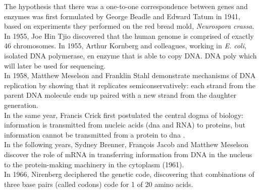 The hypothesis that there was a one-to-one correspondence between genes and enzymes was first formulated by George Beadle and Edward Tatum in 1941, based on experiments they performed on the red bread mold, \textit{Neurospora crassa}.\\


In 1955, Joe Hin Tjio discovered that the human genome is comprised of exactly 46 chromosomes.
In 1955, Arthur Kornberg and colleagues, working in \textit{E. coli}, isolated DNA polymerase, en enzyme that is able to copy DNA.
DNA poly which will later be used for sequencing.\\

In 1958, Matthew Meselson and Franklin Stahl demonstrate mechanisms of DNA replication by showing that it replicates semiconservatively: each strand from the parent DNA molecule ends up paired with a new strand from the daughter generation.\\

In the same year, Francis Crick first postulated the central dogma of biology: information is transmitted from nucleic acids (\gls{dna} and RNA) to proteins, but information cannot be transmitted from a protein to \gls{dna} \cite{crick1958protein}.\\

In the following years, Sydney Brenner, François Jacob and Matthew Meselson discover the role of mRNA in transferring information from DNA in the nucleus to the protein-making machinery in the cytoplasm (1961).\\

In 1966, Nirenberg deciphered the genetic code, discovering that combinations of three base pairs (called codons) code for 1 of 20 amino acids.\\

